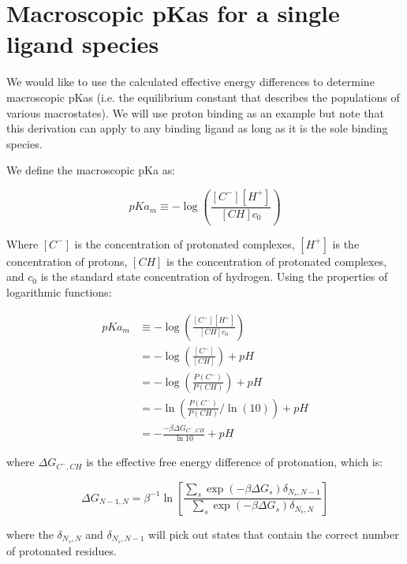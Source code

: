 \section{Macroscopic pKas for a single ligand species}

We would like to use the calculated effective energy differences to
determine macroscopic pKas (i.e. the equilibrium constant that
describes the populations of various macrostates). We will use proton
binding as an example but note that this derivation can apply to any
binding ligand as long as it is the sole binding species.

We define the macroscopic pKa as:

\begin{equation}
  pKa_m \equiv -\log \left(\frac{[C^-][H^+]}{[CH] c_0} \right)
\end{equation}

Where $[C^-]$ is the concentration of protonated complexes, $[H^+]$ is
the concentration of protons, $[CH]$ is the concentration of
protonated complexes, and $c_0$ is the standard state concentration of
hydrogen. Using the properties of logarithmic functions:

\begin{align*}
  pKa_m &\equiv -\log \left(\frac{[C^-][H^+]}{[CH] c_0} \right) \\
  &= -\log \left( \frac{[C^-]}{[CH]} \right) + pH \\
  &= -\log \left(\frac{P(C^-)}{P(CH)} \right) + pH \\
  &= -\ln \left( \frac{P(C^-)}{P(CH)}/\ln(10) \right) + pH \\
  &= -\frac{-\beta \Delta G_{C^-,CH}}{\ln 10} + pH
\end{align*}

where $\Delta G_{C^-,CH}$ is the effective free energy difference of
protonation, which is: 

\begin{equation}
\Delta G_{N-1,N} = \beta^{-1} \ln \left[ \frac{\sum_s \exp(-\beta
    \Delta G_s)\delta_{N_s,N-1}}{\sum_s \exp(-\beta \Delta
    G_s)\delta_{N_s,N}} \right]
\end{equation}

where the $\delta_{N_s,N}$ and $\delta_{N_s,N-1}$ will pick out states
that contain the correct number of protonated residues.

